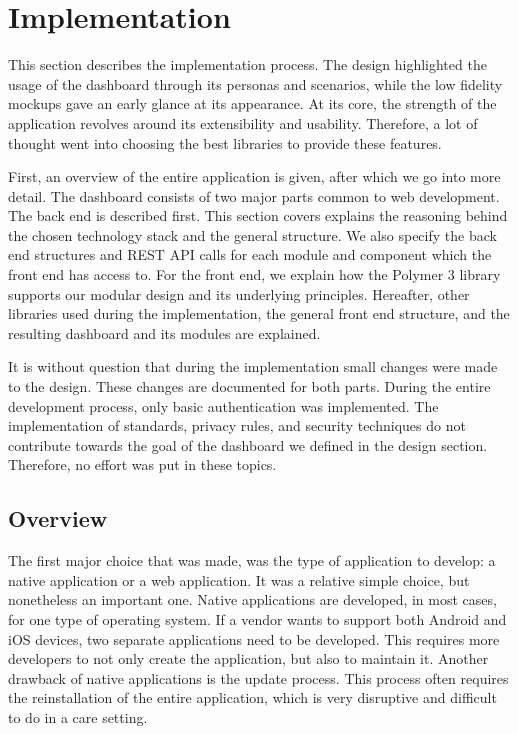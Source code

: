 \section{Implementation}\label{implementation}

This section describes the implementation process. The design highlighted the usage of the dashboard through its personas and scenarios, while the low fidelity mockups gave an early glance at its appearance. At its core, the strength of the application revolves around its extensibility and usability. Therefore, a lot of thought went into choosing the best libraries to provide these features.

First, an overview of the entire application is given, after which we go into more detail. The dashboard consists of two major parts common to web development. The back end is described first. This section covers explains the reasoning behind the chosen technology stack and the general structure. We also specify the back end structures and REST API calls for each module and component which the front end has access to. For the front end, we explain how the Polymer 3 library supports our modular design and its underlying principles. Hereafter, other libraries used during the implementation, the general front end structure, and the resulting dashboard and its modules are explained. 

It is without question that during the implementation small changes were made to the design. These changes are documented for both parts. During the entire development process, only basic authentication was implemented. The implementation of standards, privacy rules, and security techniques do not contribute towards the goal of the dashboard we defined in the design section. Therefore, no effort was put in these topics.

    \subsection{Overview}

    The first major choice that was made, was the type of application to develop: a native application or a web application. It was a relative simple choice, but nonetheless an important one. Native applications are developed, in most cases, for one type of operating system. If a vendor wants to support both Android and iOS devices, two separate applications need to be developed. This requires more developers to not only create the application, but also to maintain it. Another drawback of native applications is the update process. This process often requires the reinstallation of the entire application, which is very disruptive and difficult to do in a care setting.

